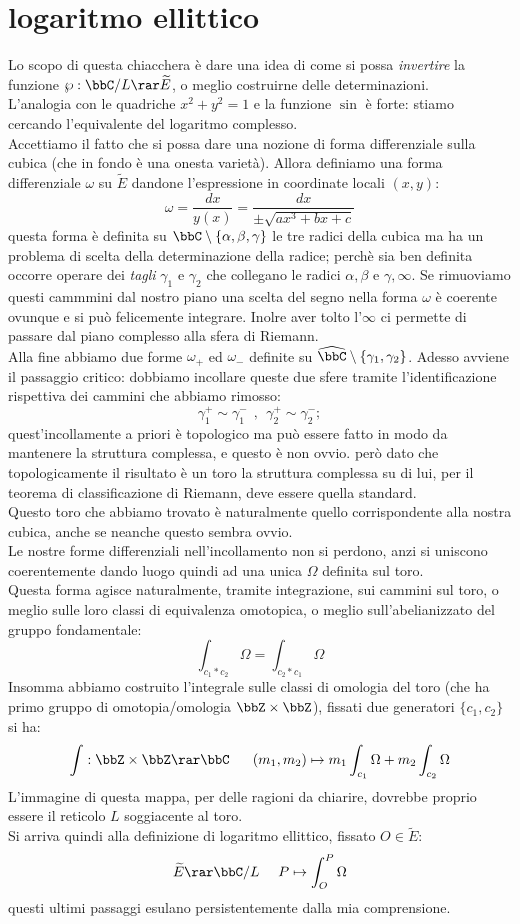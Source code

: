 \section{logaritmo ellittico}
Lo scopo di questa chiacchera è dare una idea di come si possa {\it invertire} la funzione $\wp: \bbC/L \rar \widetilde{E}$, o meglio costruirne delle determinazioni.\\
L'analogia con le quadriche $x^2+y^2=1$ e la funzione $\sin$ è forte: stiamo cercando l'equivalente del logaritmo complesso.\\
Accettiamo il fatto che si possa dare una nozione di forma differenziale sulla cubica (che in fondo è una onesta varietà). Allora definiamo una forma differenziale $\omega$ su $\widetilde{E}$ dandone l'espressione in coordinate locali $(x,y)$:
$$
\omega=\frac{dx}{y(x)}=\frac{dx}{\pm\sqrt{ax^3+bx+c}}
$$
questa forma è definita su $\bbC\setminus\{\alpha, \beta, \gamma\}$ le tre radici della cubica ma ha un problema di scelta della determinazione della radice; perchè sia ben definita occorre operare dei {\it tagli} $\gamma_1$ e $\gamma_2$ che collegano le radici $\alpha,\beta$ e $\gamma,\infty$. Se rimuoviamo questi cammmini dal nostro piano una scelta del segno nella forma $\omega$ è coerente ovunque e si può felicemente integrare. Inolre aver tolto l'$\infty$ ci permette di passare dal piano complesso alla sfera di Riemann.\\
Alla fine abbiamo due forme $\omega_+$ ed $\omega_-$ definite su $\widehat{\bbC}\setminus\{\gamma_1,\gamma_2\}$. Adesso avviene il passaggio critico: dobbiamo incollare queste due sfere tramite l'identificazione rispettiva dei cammini che abbiamo rimosso:
$$
\gamma_1^+\sim \gamma_1^-\ \ , \ \ \gamma_2^+\sim\gamma_2^-;
$$
quest'incollamente a priori è topologico ma può essere fatto in modo da mantenere la struttura complessa, e questo è non ovvio. però dato che topologicamente il risultato è un toro la struttura complessa su di lui, per il teorema di classificazione di Riemann, deve essere quella standard.\\
Questo toro che abbiamo trovato è naturalmente quello corrispondente alla nostra cubica, anche se neanche questo sembra ovvio.\\
Le nostre forme differenziali nell'incollamento non si perdono, anzi si uniscono coerentemente dando luogo quindi ad una unica $\Omega$ definita sul toro.\\
Questa forma agisce naturalmente, tramite integrazione, sui cammini sul toro, o meglio sulle loro classi di equivalenza omotopica, o meglio sull'abelianizzato del gruppo fondamentale:
$$
\int_{c_1 * c_2} \Omega=\int_{c_2 * c_1} \Omega
$$ 
Insomma abbiamo costruito l'integrale sulle classi di omologia del toro (che ha primo gruppo di omotopia/omologia $\bbZ\times \bbZ $), fissati due generatori $\{c_1,c_2\}$ si ha:
$$
\int: \bbZ\times \bbZ \rar \bbC \ \ \ \ \ (m_1,m_2)\mapsto m_1 \int_{c_1} \Omega+m_2 \int_{c_2} \Omega  
$$
L'immagine di questa mappa, per delle ragioni da chiarire, dovrebbe proprio essere il reticolo $L$ soggiacente al toro.\\
Si arriva quindi alla definizione di logaritmo ellittico, fissato $O\in \widetilde{E}$:
$$
\widetilde{E}\rar \bbC/L\ \ \ \ P\mapsto \int_O^P \Omega  
$$
questi ultimi passaggi esulano persistentemente dalla mia comprensione.
